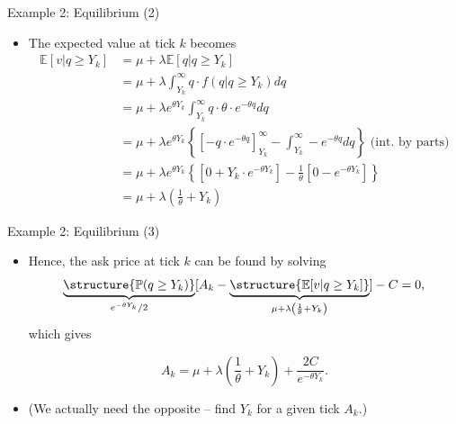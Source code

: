 \documentclass[english,10pt
,aspectratio=169
]{beamer}
\begin{document}
\begin{frame}{Example 2: Equilibrium (2)}
	\begin{itemize}
		\item The expected value at tick $k$ becomes
		\begin{align*}
		\mathbb{E}[v|q \geq Y_{k}] & =  \mu + \lambda \mathbb{E}[q|q \geq Y_{k}]\\
		&=\mu+ \lambda \int^\infty_{Y_k} q \cdot f(q|q \geq Y_{k}) dq\\
		&=\mu+ \lambda e^{\theta Y_{k}} \int^\infty_{Y_k} q \cdot \theta \cdot e^{-\theta q} dq\\
		& =  \mu+ \lambda e^{\theta Y_{k}} \left\{\left[- q \cdot e^{-\theta q} \right]^\infty_{Y_k} -\int^\infty_{Y_k} -e^{-\theta q} dq   \right\}\text{ (int. by parts)} \\
		& =  \mu+ \lambda e^{\theta Y_{k}} \left\{\left[0+ Y_k \cdot  e^{-\theta Y_k} \right] -\frac{1}{\theta}[0-e^{-\theta Y_k}]   \right\} \\
		& = \mu + \lambda \left( \frac{1}{\theta }+ Y_{k} \right)
		\end{align*}
	\end{itemize}
\end{frame}


\begin{frame}{Example 2: Equilibrium (3)}
	\begin{itemize}
		\item Hence, the ask price at tick $k$ can be found by solving
		\[
		\underbrace{\structure{\mathbb{P}(q \geq Y_k)}}_{e^{-\theta Y_{k}}/2}[A_k-\underbrace{\structure{\mathbb{E}[v|q \geq Y_k]}}_{\mu + \lambda \left( \frac{1}{\theta }+ Y_{k} \right)}] - C = 0,
		\]
		which gives
		\begin{block}{}
			\[
			A_k=\mu + \lambda \left( \frac{1}{\theta }+ Y_{k}\right) + \frac{2C}{e^{-\theta Y_{k}}}.
			\]
		\end{block}
		\item (We actually need the opposite -- find $Y_k$ for a given tick $A_k$.)
	\end{itemize}
\end{frame}
\end{document}

